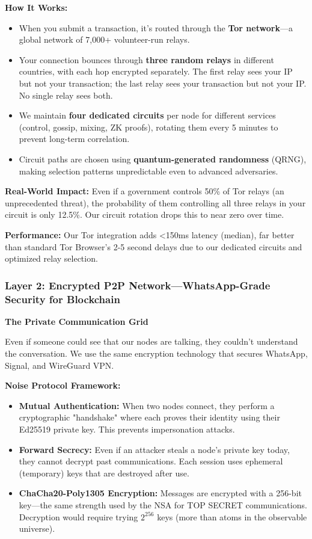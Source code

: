 \documentclass[11pt,a4paper]{article}
\begin{document}
\textbf{How It Works:}
\begin{itemize}
    \item When you submit a transaction, it's routed through the \textbf{Tor network}—a global network of 7,000+ volunteer-run relays.

    \item Your connection bounces through \textbf{three random relays} in different countries, with each hop encrypted separately. The first relay sees your IP but not your transaction; the last relay sees your transaction but not your IP. No single relay sees both.

    \item We maintain \textbf{four dedicated circuits} per node for different services (control, gossip, mixing, ZK proofs), rotating them every 5 minutes to prevent long-term correlation.

    \item Circuit paths are chosen using \textbf{quantum-generated randomness} (QRNG), making selection patterns unpredictable even to advanced adversaries.
\end{itemize}

\textbf{Real-World Impact:} Even if a government controls 50\% of Tor relays (an unprecedented threat), the probability of them controlling all three relays in your circuit is only 12.5\%. Our circuit rotation drops this to near zero over time.

\textbf{Performance:} Our Tor integration adds <150ms latency (median), far better than standard Tor Browser's 2-5 second delays due to our dedicated circuits and optimized relay selection.

\subsubsection{Layer 2: Encrypted P2P Network—WhatsApp-Grade Security for Blockchain}

\textbf{The Private Communication Grid}

Even if someone could see that our nodes are talking, they couldn't understand the conversation. We use the same encryption technology that secures WhatsApp, Signal, and WireGuard VPN.

\textbf{Noise Protocol Framework:}
\begin{itemize}
    \item \textbf{Mutual Authentication:} When two nodes connect, they perform a cryptographic "handshake" where each proves their identity using their Ed25519 private key. This prevents impersonation attacks.

    \item \textbf{Forward Secrecy:} Even if an attacker steals a node's private key today, they cannot decrypt past communications. Each session uses ephemeral (temporary) keys that are destroyed after use.

    \item \textbf{ChaCha20-Poly1305 Encryption:} Messages are encrypted with a 256-bit key—the same strength used by the NSA for TOP SECRET communications. Decryption would require trying $2^{256}$ keys (more than atoms in the observable universe).
\end{itemize}
\end{document}

